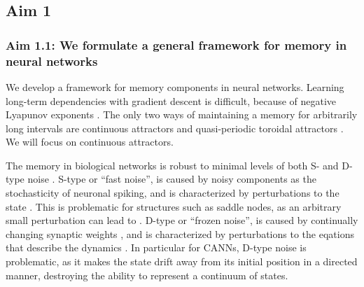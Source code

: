 \documentclass[12pt,letterpaper, onecolumn]{article}
\theoremstyle{definition}
\theoremstyle{remark}
\begin{document}
\subsection*{Aim 1}

\subsubsection*{Aim 1.1: We formulate a general framework for memory in neural networks}

We develop a framework for memory components in neural networks.
Learning long-term dependencies with gradient descent is difficult, because of negative Lyapunov exponents \citep{bengio1994learning, orvieto2023b}.
The only two ways of maintaining a memory for arbitrarily long intervals are continuous attractors and quasi-periodic toroidal attractors \citep{Park2023a}.
We will focus on continuous attractors. %

The memory in biological networks is robust to minimal levels of both S- and D-type noise \citep{Park2023a}.
S-type or ``fast noise'', is caused by noisy components as the stochasticity of neuronal spiking, and is characterized by perturbations to the state \citep{panichello2019, burak2012}.
This is problematic for structures such as saddle nodes, as an arbitrary small perturbation can lead to .
D-type or  ``frozen noise'', is caused by continually changing synaptic weights \citep{flesch2023continual}, and is characterized by perturbations to the eqations that describe the dynamics \citep{seeholzer2019, laje2013, flesch2022}.
In particular for CANNs, D-type noise is problematic, as it makes the state drift away from its initial position in a directed manner, destroying the ability to represent a continuum of states.
\end{document}
